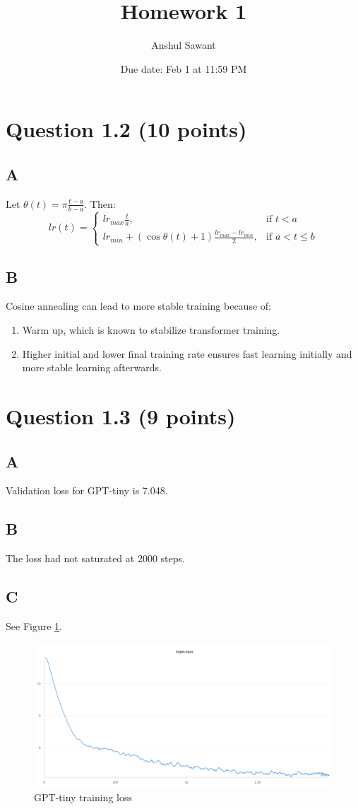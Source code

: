 \documentclass{article}
\title{Homework 1}
\author{Anshul Sawant}
\date{Due date: Feb 1 at 11:59 PM}
\begin{document}
\maketitle

\section*{Question 1.2 (10 points)}
\subsection*{A}
Let $\theta(t) = \pi \frac{t - a}{b - a}$. Then:
\[
lr(t)=
\begin{cases}
    lr_{max} \frac{t}{a},& \text{if } t < a\\ 
    lr_{min} + (\cos{\theta(t)} + 1)\frac{lr_{max} - lr_{min}}{2},& \text{if } a < t \leq b
\end{cases}
\]
\subsection*{B}
Cosine annealing can lead to more stable training because of:
\begin{enumerate}
\item Warm up, which is known to stabilize transformer training.
\item Higher initial and lower final training rate ensures fast learning initially and more stable learning afterwards.
\end{enumerate}
\section*{Question 1.3 (9 points)}
\subsection*{A}
Validation loss for GPT-tiny is 7.048.
\subsection*{B}
The loss had not saturated at 2000 steps.
\subsection*{C}
See Figure \ref{fig:loss}.
\begin{figure}
\centering
\includegraphics[totalheight=6cm]{training_loss.png}
\caption{GPT-tiny training loss}
\label{fig:loss}
\end{figure}
\end{document}
